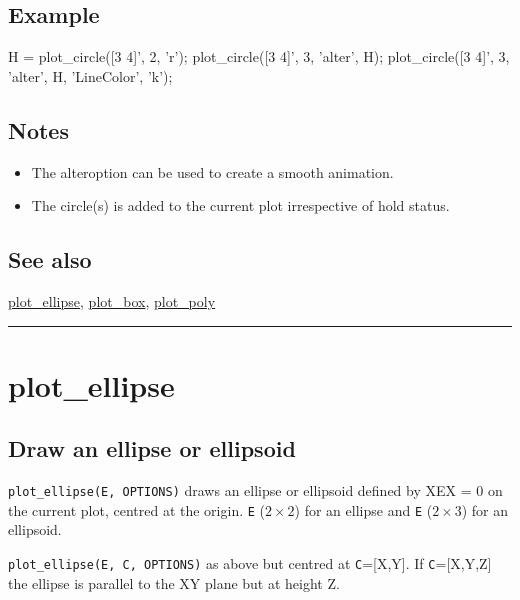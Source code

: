 \subsection*{Example}
\begin{Code}
    H = plot_circle([3 4]', 2, 'r');  %
    plot_circle([3 4]', 3, 'alter', H); %
    plot_circle([3 4]', 3, 'alter', H, 'LineColor', 'k'); %

\end{Code}

\subsection*{Notes}
\begin{itemize}
  \item The \textquotesingle alter\textquotesingle  option can be used to create a smooth animation.
  \item The circle(s) is added to the current plot irrespective of hold status.
\end{itemize}

\subsection*{See also}


\hyperlink{plot_ellipse}{\color{blue} plot\_ellipse}, \hyperlink{plot_box}{\color{blue} plot\_box}, \hyperlink{plot_poly}{\color{blue} plot\_poly}

\vspace{1.5ex}\rule{\textwidth}{1mm}

\hypertarget{plot\_ellipse}{\section*{plot\_ellipse}}
\subsection*{Draw an ellipse or ellipsoid}


\texttt{plot\_ellipse(E, OPTIONS)} draws an ellipse or ellipsoid defined by X\textquotesingle EX =
0 on the current plot, centred at the origin.  \texttt{E} ($2 \times 2$) for an ellipse and
\texttt{E} ($2 \times 3$) for an ellipsoid.



\texttt{plot\_ellipse(E, C, OPTIONS)} as above but centred at \texttt{C}=[X,Y].  If
\texttt{C}=[X,Y,Z] the ellipse is parallel to the XY plane but at height Z.



